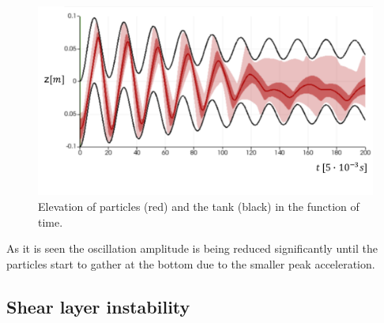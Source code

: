 \documentclass[a4paper,12pt,openany]{book}
\theoremstyle{break}
\begin{document}
\begin{figure}[h!]
  \includegraphics[scale=0.6]{particle_damper_time_series.pdf}
  \centering
  \caption{Elevation of particles (red) and the tank (black) in the function of time.}
  \label{fig:particle_damper_geom}
\end{figure}\vspace*{3pt}
As it is seen the oscillation amplitude is being reduced significantly until the particles start to gather at the bottom due to the smaller peak acceleration.


\subsection{Shear layer instability}
\end{document}
